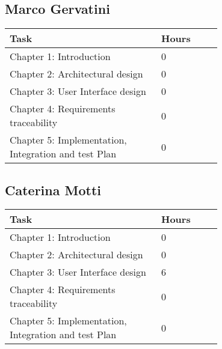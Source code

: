 \subsection{Marco Gervatini}
\begin{center}
	\begin{tabular}{@{}p{0.5\linewidth} p{0.2\linewidth}@{}}
		\hline
		\textbf{Task} & \textbf{Hours} \\ \hline
             Chapter 1: Introduction & 0 \\ \hline
             Chapter 2: Architectural design & 0 \\ \hline
             Chapter 3: User Interface design & 0 \\ \hline
             Chapter 4: Requirements traceability & 0 \\ \hline
             Chapter 5: Implementation, Integration
    and test Plan & 0 \\ \hline
	\end{tabular}
\end{center}

\subsection{Caterina Motti}
\begin{center}
	\begin{tabular}{@{}p{0.5\linewidth} p{0.2\linewidth}@{}}
		\hline
		\textbf{Task} & \textbf{Hours} \\ \hline
            Chapter 1: Introduction & 0 \\ \hline
            Chapter 2: Architectural design & 0 \\ \hline
            Chapter 3: User Interface design & 6 \\ \hline
            Chapter 4: Requirements traceability & 0 \\ \hline
            Chapter 5: Implementation, Integration
    and test Plan & 0 \\ \hline
	\end{tabular}
\end{center}
